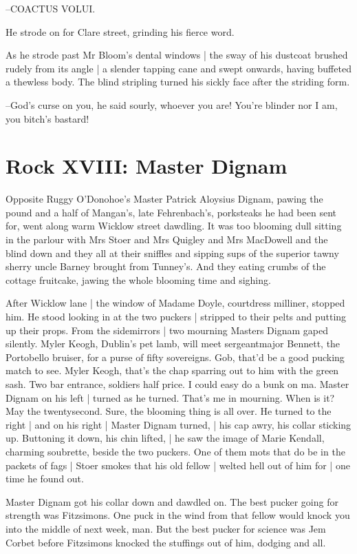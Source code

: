 --COACTUS VOLUI.

He strode on for Clare street,
grinding his fierce word.

As he strode past Mr Bloom's dental windows |
the sway of his dustcoat brushed rudely from its angle |
a slender tapping cane and swept onwards,
having buffeted a thewless body.
The blind stripling turned his sickly face after the striding form.

--God's curse on you,
he said sourly,
whoever you are!
You're blinder nor I am,
you bitch's bastard!


\section*{Rock XVIII: Master Dignam}


Opposite Ruggy O'Donohoe's
Master Patrick Aloysius Dignam,
pawing the pound and a half of Mangan's,
late Fehrenbach's,
porksteaks he
had been sent for,
went along warm Wicklow street dawdling.
It was too
blooming dull sitting in the parlour
with Mrs Stoer and Mrs Quigley and
Mrs MacDowell
and the blind down
and they all at their sniffles
and
sipping sups of the superior tawny sherry
uncle Barney brought from
Tunney's.
And they eating crumbs of the cottage fruitcake,
jawing the
whole blooming time and sighing.

After Wicklow lane |
the window of Madame Doyle, courtdress milliner,
stopped him.
He stood looking in at the two puckers |
stripped to their pelts and putting up their props.
From the sidemirrors |
two mourning Masters Dignam gaped silently.
Myler Keogh, Dublin's pet lamb,
will meet sergeantmajor Bennett, the Portobello bruiser,
for a purse of fifty sovereigns.
Gob, that'd be a good pucking match to see.
Myler Keogh, that's the chap sparring out to him with the green sash.
Two bar entrance, soldiers half price.
I could easy do a bunk on ma.
Master Dignam on his left |
turned as he turned.
That's me in mourning.
When is it?
May the twentysecond.
Sure, the blooming thing is all over.
He turned to the right |
and on his right |
Master Dignam turned, |
his cap awry, his collar sticking up.
Buttoning it down, his chin lifted, |
he saw the image of Marie Kendall, charming soubrette,
beside the two puckers.
One of them mots that do be in the packets of fags |
Stoer smokes that his old fellow |
welted hell out of him for |
one time he found out.

Master Dignam got his collar down and dawdled on.
The best pucker
going for strength was Fitzsimons.
One puck in the wind from that fellow
would knock you into the middle of next week, man.
But the best pucker
for science
was Jem Corbet
before Fitzsimons knocked the stuffings out of
him,
dodging and all.

